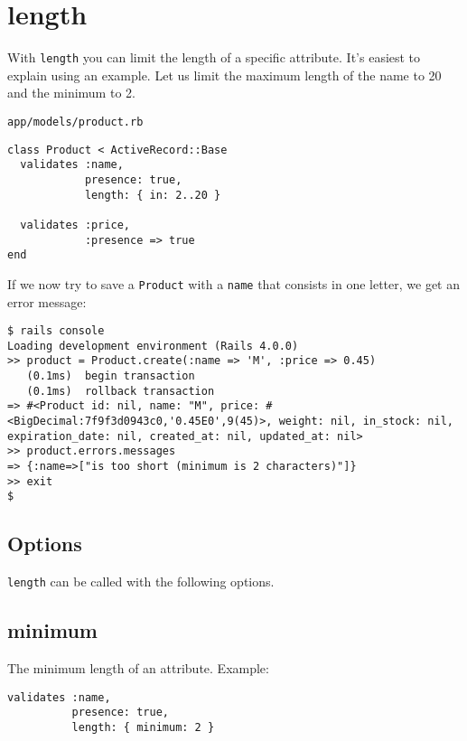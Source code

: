 \documentclass[a4paper]{book}
\newcommand{\chap}[1]{\newpage\thispagestyle{empty}\chapter{#1}\label{chap:\thechapter}}
\begin{document}
\chap{length}\label{length}

With \texttt{length} you can limit the length of a specific attribute. It's easiest to explain using an example. Let us limit the maximum length of the name to 20 and the minimum to 2.

\texttt{app/models/product.rb}

\begin{shaded}\begin{verbatim}
class Product < ActiveRecord::Base
  validates :name,
            presence: true,
            length: { in: 2..20 }

  validates :price,
            :presence => true
end
\end{verbatim}\end{shaded}

If we now try to save a \texttt{Product} with a \texttt{name} that consists in one letter, we get an error message:

\begin{shaded}\begin{verbatim}
$ rails console
Loading development environment (Rails 4.0.0)
>> product = Product.create(:name => 'M', :price => 0.45)
   (0.1ms)  begin transaction
   (0.1ms)  rollback transaction
=> #<Product id: nil, name: "M", price: #<BigDecimal:7f9f3d0943c0,'0.45E0',9(45)>, weight: nil, in_stock: nil, expiration_date: nil, created_at: nil, updated_at: nil>
>> product.errors.messages
=> {:name=>["is too short (minimum is 2 characters)"]}
>> exit
$
\end{verbatim}\end{shaded}

\section{Options}\label{options-3}

\texttt{length} can be called with the following options.

\section{minimum}\label{minimum-1}

The minimum length of an attribute. Example:

\begin{shaded}\begin{verbatim}
validates :name,
          presence: true,
          length: { minimum: 2 }
\end{verbatim}\end{shaded}
\end{document}

